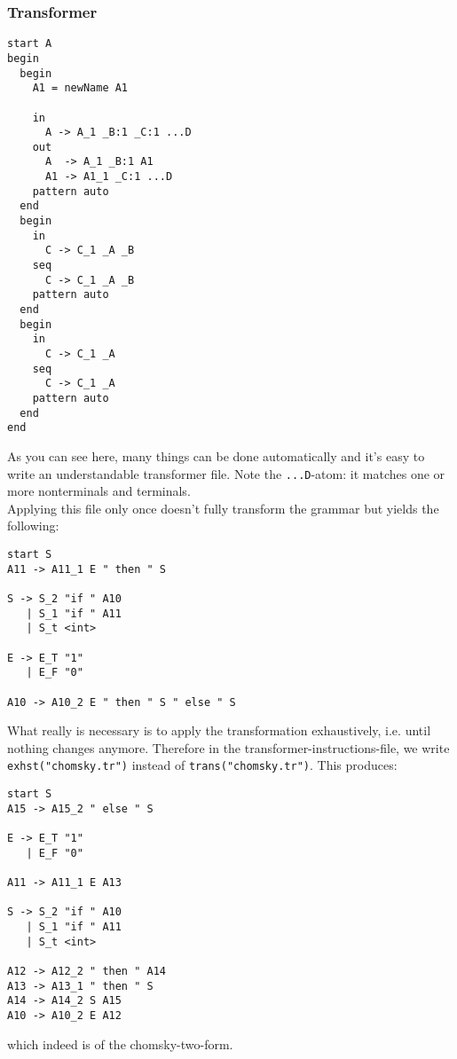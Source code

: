 \documentclass[a4paper]{article}
\begin{document}
\subsubsection*{Transformer}
\begin{verbatim}
start A
begin
  begin
    A1 = newName A1
    
    in
      A -> A_1 _B:1 _C:1 ...D 
    out 
      A  -> A_1 _B:1 A1  
      A1 -> A1_1 _C:1 ...D
    pattern auto
  end
  begin
    in
      C -> C_1 _A _B
    seq
      C -> C_1 _A _B
    pattern auto
  end
  begin
    in
      C -> C_1 _A
    seq
      C -> C_1 _A
    pattern auto
  end
end

\end{verbatim}
As you can see here, many things can be done automatically and it's easy to write an understandable transformer file. Note the \verb|...D|-atom: it matches one or more nonterminals and terminals.\\
Applying this file only once doesn't fully transform the grammar but yields the following:
\begin{verbatim}
start S
A11 -> A11_1 E " then " S

S -> S_2 "if " A10
   | S_1 "if " A11
   | S_t <int>

E -> E_T "1"
   | E_F "0"

A10 -> A10_2 E " then " S " else " S
\end{verbatim}
What really is necessary is to apply the transformation exhaustively, i.e. until nothing changes anymore. Therefore in the transformer-instructions-file, we write \verb|exhst("chomsky.tr")| instead of \verb|trans("chomsky.tr")|. This produces:
\begin{verbatim}
start S
A15 -> A15_2 " else " S

E -> E_T "1"
   | E_F "0"

A11 -> A11_1 E A13

S -> S_2 "if " A10
   | S_1 "if " A11
   | S_t <int>

A12 -> A12_2 " then " A14
A13 -> A13_1 " then " S
A14 -> A14_2 S A15
A10 -> A10_2 E A12
\end{verbatim}
which indeed is of the chomsky-two-form.
\end{document}
